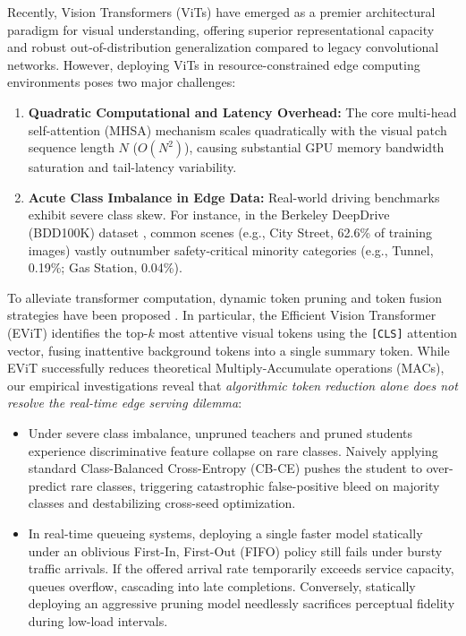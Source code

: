 \documentclass[conference]{IEEEtran}
\newcounter{algorithm}
\begin{document}
Recently, Vision Transformers (ViTs) \cite{dosovitskiy2021image, touvron2021training} have emerged as a premier architectural paradigm for visual understanding, offering superior representational capacity and robust out-of-distribution generalization compared to legacy convolutional networks. However, deploying ViTs in resource-constrained edge computing environments poses two major challenges:
\begin{enumerate}
    \item \textbf{Quadratic Computational and Latency Overhead:} The core multi-head self-attention (MHSA) mechanism scales quadratically with the visual patch sequence length $N$ ($O(N^2)$), causing substantial GPU memory bandwidth saturation and tail-latency variability.
    \item \textbf{Acute Class Imbalance in Edge Data:} Real-world driving benchmarks exhibit severe class skew. For instance, in the Berkeley DeepDrive (BDD100K) dataset \cite{yu2020bdd100k}, common scenes (e.g., City Street, 62.6\% of training images) vastly outnumber safety-critical minority categories (e.g., Tunnel, 0.19\%; Gas Station, 0.04\%).
\end{enumerate}

To alleviate transformer computation, dynamic token pruning and token fusion strategies have been proposed \cite{liang2022not, rao2021dynamicvit, kong2022spvit}. In particular, the Efficient Vision Transformer (EViT) \cite{liang2022not} identifies the top-$k$ most attentive visual tokens using the \texttt{[CLS]} attention vector, fusing inattentive background tokens into a single summary token. While EViT successfully reduces theoretical Multiply-Accumulate operations (MACs), our empirical investigations reveal that \textit{algorithmic token reduction alone does not resolve the real-time edge serving dilemma}:
\begin{itemize}
    \item Under severe class imbalance, unpruned teachers and pruned students experience discriminative feature collapse on rare classes. Naively applying standard Class-Balanced Cross-Entropy (CB-CE) \cite{cui2019class} pushes the student to over-predict rare classes, triggering catastrophic false-positive bleed on majority classes and destabilizing cross-seed optimization.
    \item In real-time queueing systems, deploying a single faster model statically under an oblivious First-In, First-Out (FIFO) policy still fails under bursty traffic arrivals. If the offered arrival rate temporarily exceeds service capacity, queues overflow, cascading into late completions. Conversely, statically deploying an aggressive pruning model needlessly sacrifices perceptual fidelity during low-load intervals.
\end{itemize}
\end{document}
